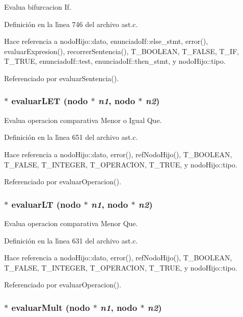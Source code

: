 Evalua bifurcacion If. 



Definici\'{o}n en la l\'{\i}nea 746 del archivo ast.c.

Hace referencia a nodo\-Hijo::dato, enunciado\-If::else\_\-stmt, error(), evaluar\-Expresion(), recorrer\-Sentencia(), T\_\-BOOLEAN, T\_\-FALSE, T\_\-IF, T\_\-TRUE, enunciado\-If::test, enunciado\-If::then\_\-stmt, y nodo\-Hijo::tipo.

Referenciado por evaluar\-Sentencia().
\subsubsection{$\ast$ evaluar\-LET ({\bf nodo} $\ast$ {\em n1}, {\bf nodo} $\ast$ {\em n2})}\label{ast_8c_a34}


Evalua operacion comparativa Menor o Igual Que. 



Definici\'{o}n en la l\'{\i}nea 651 del archivo ast.c.

Hace referencia a nodo\-Hijo::dato, error(), ref\-Nodo\-Hijo(), T\_\-BOOLEAN, T\_\-FALSE, T\_\-INTEGER, T\_\-OPERACION, T\_\-TRUE, y nodo\-Hijo::tipo.

Referenciado por evaluar\-Operacion().
\subsubsection{$\ast$ evaluar\-LT ({\bf nodo} $\ast$ {\em n1}, {\bf nodo} $\ast$ {\em n2})}\label{ast_8c_a33}


Evalua operacion comparativa Menor Que. 



Definici\'{o}n en la l\'{\i}nea 631 del archivo ast.c.

Hace referencia a nodo\-Hijo::dato, error(), ref\-Nodo\-Hijo(), T\_\-BOOLEAN, T\_\-FALSE, T\_\-INTEGER, T\_\-OPERACION, T\_\-TRUE, y nodo\-Hijo::tipo.

Referenciado por evaluar\-Operacion().
\subsubsection{$\ast$ evaluar\-Mult ({\bf nodo} $\ast$ {\em n1}, {\bf nodo} $\ast$ {\em n2})}\label{ast_8c_a36}


